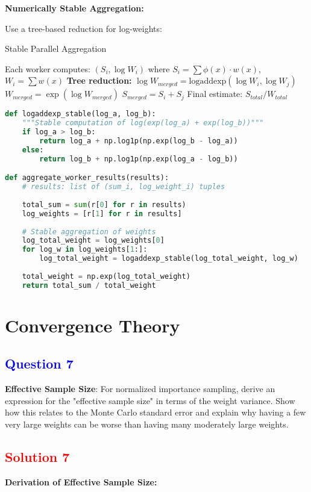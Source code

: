 \documentclass[11pt]{article}
\newcommand{\question}[1]{\subsection*{\textcolor{blue}{Question #1}}}
\newcommand{\solution}[1]{\subsection*{\textcolor{red}{Solution #1}}}
\begin{document}
\textbf{Numerically Stable Aggregation:}

Use a tree-based reduction for log-weights:

\begin{algorithm}
\caption{Stable Parallel Aggregation}
\begin{algorithmic}[1]
\STATE Each worker computes: $(S_i, \log W_i)$ where $S_i = \sum \phi(x) \cdot w(x)$, $W_i = \sum w(x)$
\STATE \textbf{Tree reduction:}
        \STATE $\log W_{merged} = \text{logaddexp}(\log W_i, \log W_j)$
        \STATE $W_{merged} = \exp(\log W_{merged})$
        \STATE $S_{merged} = S_i + S_j$
    \ENDFOR
\ENDFOR
\STATE Final estimate: $S_{total} / W_{total}$
\end{algorithmic}
\end{algorithm}

\begin{lstlisting}[language=Python, basicstyle=\small]
def logaddexp_stable(log_a, log_b):
    """Stable computation of log(exp(log_a) + exp(log_b))"""
    if log_a > log_b:
        return log_a + np.log1p(np.exp(log_b - log_a))
    else:
        return log_b + np.log1p(np.exp(log_a - log_b))

def aggregate_worker_results(results):
    # results: list of (sum_i, log_weight_i) tuples
    
    total_sum = sum(r[0] for r in results)
    log_weights = [r[1] for r in results]
    
    # Stable aggregation of weights
    log_total_weight = log_weights[0]
    for log_w in log_weights[1:]:
        log_total_weight = logaddexp_stable(log_total_weight, log_w)
    
    total_weight = np.exp(log_total_weight)
    return total_sum / total_weight
\end{lstlisting}

\section{Convergence Theory}

\question{7}
\textbf{Effective Sample Size}: For normalized importance sampling, derive an expression for the "effective sample size" in terms of the weight variance. Show how this relates to the Monte Carlo standard error and explain why having a few very large weights can be worse than having many moderately large weights.

\solution{7}
\textbf{Derivation of Effective Sample Size:}
\end{document}
